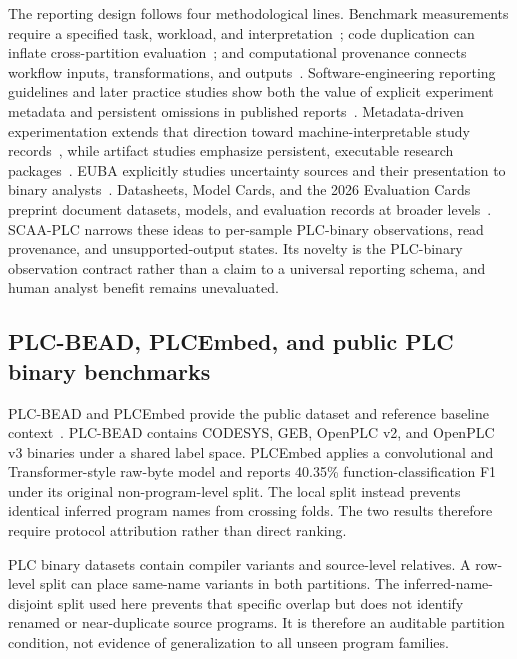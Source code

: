 \documentclass[manuscript,screen,review]{acmart}
\begin{document}
The reporting design follows four methodological lines. Benchmark measurements require a specified task, workload, and interpretation~\cite{sim_benchmarking2003}; code duplication can inflate cross-partition evaluation~\cite{allamanis2019adverse}; and computational provenance connects workflow inputs, transformations, and outputs~\cite{freire_provenance2008}. Software-engineering reporting guidelines and later practice studies show both the value of explicit experiment metadata and persistent omissions in published reports~\cite{kitchenham_reporting2008,revoredo_reporting2021}. Metadata-driven experimentation extends that direction toward machine-interpretable study records~\cite{santana_metadata2026}, while artifact studies emphasize persistent, executable research packages~\cite{heumueller_software_artifacts2020}. EUBA explicitly studies uncertainty sources and their presentation to binary analysts~\cite{euba_sandia2021}. Datasheets, Model Cards, and the 2026 Evaluation Cards preprint document datasets, models, and evaluation records at broader levels~\cite{datasheets_for_datasets,model_cards,evaluation_cards_arxiv2026}. SCAA-PLC narrows these ideas to per-sample PLC-binary observations, read provenance, and unsupported-output states. Its novelty is the PLC-binary observation contract rather than a claim to a universal reporting schema, and human analyst benefit remains unevaluated.

\subsection{PLC-BEAD, PLCEmbed, and public PLC binary benchmarks}

PLC-BEAD and PLCEmbed provide the public dataset and reference baseline context~\cite{plcbead_plcembed_kdd2025,plcbead_plcembed_repo}. PLC-BEAD contains CODESYS, GEB, OpenPLC v2, and OpenPLC v3 binaries under a shared label space. PLCEmbed applies a convolutional and Transformer-style raw-byte model and reports 40.35\% function-classification F1 under its original non-program-level split. The local split instead prevents identical inferred program names from crossing folds. The two results therefore require protocol attribution rather than direct ranking.

PLC binary datasets contain compiler variants and source-level relatives. A row-level split can place same-name variants in both partitions. The inferred-name-disjoint split used here prevents that specific overlap but does not identify renamed or near-duplicate source programs. It is therefore an auditable partition condition, not evidence of generalization to all unseen program families.
\end{document}

